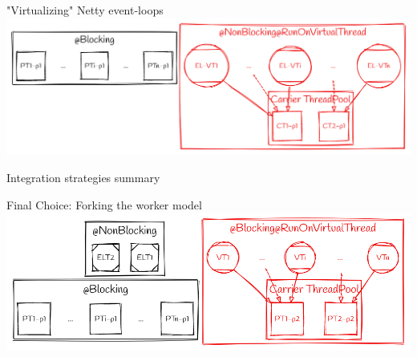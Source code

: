 \documentclass{beamer}
\begin{document}
\begin{frame}{"Virtualizing" Netty event-loops}
    \includegraphics[width=\textwidth]{assets/vt_el.png}
\end{frame}
\begin{frame}{Integration strategies summary}
    
\end{frame}
\begin{frame}{Final Choice: Forking the worker model}
    \includegraphics[width=\textwidth]{assets/forking_workers.png}
\end{frame}
\end{document}
